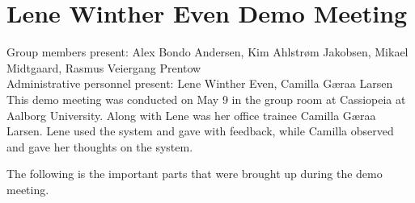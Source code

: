 \section{Lene Winther Even Demo Meeting}
\label{sec:lenedemotwo}
Group members present: Alex Bondo Andersen, Kim Ahlstr\o{}m Jakobsen, Mikael Midtgaard, Rasmus Veiergang Prentow\\
Administrative personnel present: Lene Winther Even, Camilla G\ae{}raa Larsen\\

This demo meeting was conducted on May 9\ths{} in the group room at Cassiopeia at Aalborg University.
Along with Lene was her office trainee Camilla G\ae{}raa Larsen. 
Lene used the system and gave with feedback, while Camilla observed and gave her thoughts on the system.

The following is the important parts that were brought up during the demo meeting.

